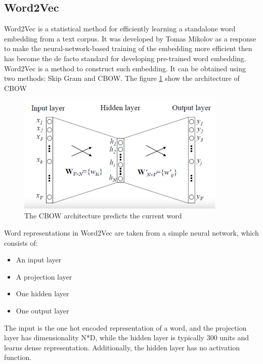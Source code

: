 \subsection{Word2Vec}
Word2Vec is a statistical method for efficiently learning a standalone word embedding from a text corpus. It was developed by Tomas Mikolov \cite{mikolov2013efficient} as a response to make the neural-network-based training of the embedding more efficient then has become the de facto standard for developing pre-trained word embedding. Word2Vec is a method to construct such  embedding. It can be obtained using two methods: Skip Gram and CBOW. The figure \ref{fig:CBOW} show the architecture of CBOW
\begin{figure}[H]
	\centering 
	\vspace{20pt}\includegraphics[width=10cm]{images/Word2Vec.png}
	\caption{The CBOW architecture predicts the current word} 
	\label{fig:CBOW}
\end{figure}
Word representations in Word2Vec are taken from a simple neural network, which consists of:
\begin{itemize}
  \item {An input layer}
  \item {A projection layer}
  \item {One hidden layer}
  \item{One output layer}
\end{itemize}
The input is the one hot encoded representation of a word, and the projection layer has dimensionality N*D, while the hidden layer is typically 300 units and learns dense representation. Additionally, the hidden layer has no activation function.
